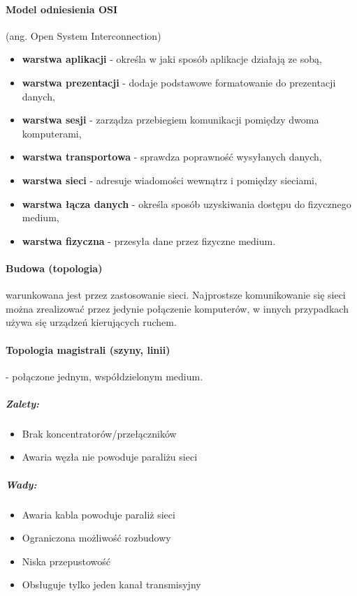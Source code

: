 \documentclass[a4paper,twoside]{report}
\begin{document}
\medskip
\paragraph{Model odniesienia OSI} (ang. Open System Interconnection) 
\begin{itemize}
\item \textbf{warstwa aplikacji} - określa w jaki sposób aplikacje działają ze sobą,
\item \textbf{warstwa prezentacji} - dodaje podstawowe formatowanie do prezentacji danych,
\item \textbf{warstwa sesji} - zarządza przebiegiem komunikacji pomiędzy dwoma komputerami,
\item \textbf{warstwa transportowa} - sprawdza poprawność wysyłanych danych,
\item \textbf{warstwa sieci} - adresuje wiadomości wewnątrz i pomiędzy sieciami,
\item \textbf{warstwa łącza danych} - określa sposób uzyskiwania dostępu do fizycznego medium,
\item \textbf{warstwa fizyczna} - przesyła dane przez fizyczne medium.
\end{itemize}

\paragraph{Budowa (topologia)} warunkowana jest przez zastosowanie sieci. Najprostsze komunikowanie się sieci można zrealizować przez jedynie połączenie komputerów, w innych przypadkach używa się urządzeń kierujących ruchem.

\paragraph{Topologia magistrali (szyny, linii)} - połączone jednym, współdzielonym medium.
\subparagraph{Zalety:}
\begin{itemize}
\item Brak koncentratorów/przełączników
\item Awaria węzła nie powoduje paraliżu sieci
\end{itemize}
\subparagraph{Wady:}
\begin{itemize}
\item Awaria kabla powoduje paraliż sieci
\item Ograniczona możliwość rozbudowy
\item Niska przepustowość
\item Obsługuje tylko jeden kanał transmisyjny
\end{itemize}
\end{document}
